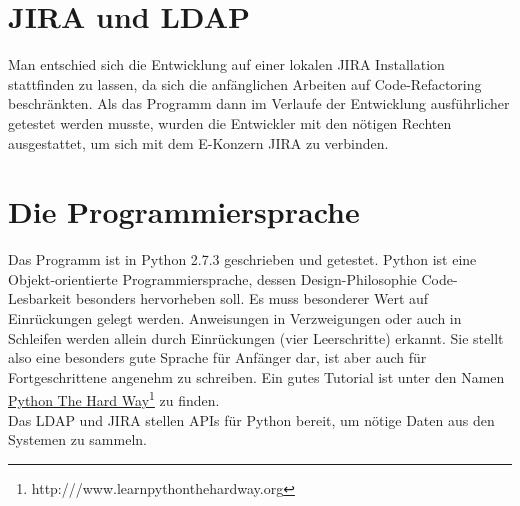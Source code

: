 \documentclass[a4paper,12pt]{report}
\begin{document}
	\section{JIRA und LDAP}
	Man entschied sich die Entwicklung auf einer lokalen JIRA Installation stattfinden zu lassen, da sich die anfänglichen Arbeiten auf Code-Refactoring beschränkten. Als das Programm dann im Verlaufe der Entwicklung ausführlicher getestet werden musste, wurden die Entwickler mit den nötigen Rechten ausgestattet, um sich mit dem E-Konzern JIRA zu verbinden.
	
	\section{Die Programmiersprache}
	Das Programm ist in Python 2.7.3 geschrieben und getestet. Python ist eine Objekt-orientierte Programmiersprache, dessen Design-Philosophie Code-Lesbarkeit besonders hervorheben soll. Es muss besonderer Wert auf Einrückungen gelegt werden. Anweisungen in Verzweigungen oder auch in Schleifen werden allein durch Einrückungen (vier Leerschritte) erkannt. Sie stellt also eine besonders gute Sprache für Anfänger dar, ist aber auch für Fortgeschrittene angenehm zu schreiben. Ein gutes Tutorial ist unter den Namen \href{http:///www.learnpythonthehardway.org}{Python The Hard Way}\footnote{http:///www.learnpythonthehardway.org} zu finden.\\
	Das LDAP und JIRA stellen APIs für Python bereit, um nötige Daten aus den Systemen zu sammeln.
	
\end{document}
